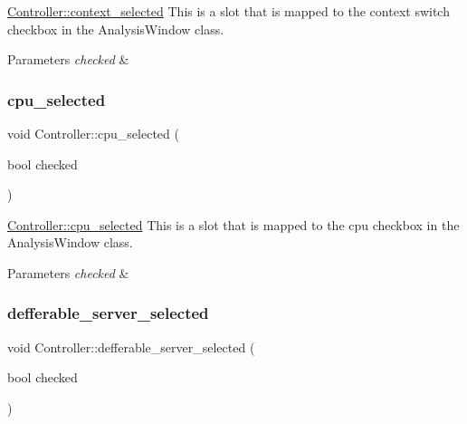 \hyperlink{classController_a1573db92761b7e61b6dcace9c97aebf5}{Controller\+::context\+\_\+selected} This is a slot that is mapped to the context switch checkbox in the Analysis\+Window class. 


\begin{DoxyParams}{Parameters}
{\em checked} & \\
\hline
\end{DoxyParams}
\mbox{\label{classController_ac9238da3e2cdd53dbc2a08cf9a55d4d2}} 
\subsubsection{\texorpdfstring{cpu\+\_\+selected}{cpu\_selected}}
{\footnotesize\ttfamily void Controller\+::cpu\+\_\+selected (\begin{DoxyParamCaption}\item[{bool}]{checked }\end{DoxyParamCaption})\hspace{0.3cm}{\ttfamily [slot]}}



\hyperlink{classController_ac9238da3e2cdd53dbc2a08cf9a55d4d2}{Controller\+::cpu\+\_\+selected} This is a slot that is mapped to the cpu checkbox in the Analysis\+Window class. 


\begin{DoxyParams}{Parameters}
{\em checked} & \\
\hline
\end{DoxyParams}
\mbox{\label{classController_a1c4186c6a1366dc848cdeb68261dc12e}} 
\subsubsection{\texorpdfstring{defferable\+\_\+server\+\_\+selected}{defferable\_server\_selected}}
{\footnotesize\ttfamily void Controller\+::defferable\+\_\+server\+\_\+selected (\begin{DoxyParamCaption}\item[{bool}]{checked }\end{DoxyParamCaption})\hspace{0.3cm}{\ttfamily [slot]}}




